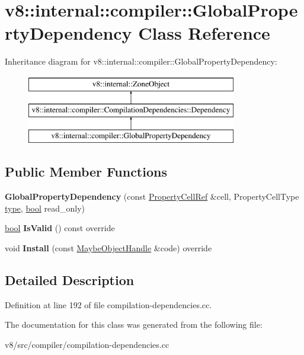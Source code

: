 \hypertarget{classv8_1_1internal_1_1compiler_1_1GlobalPropertyDependency}{}\section{v8\+:\+:internal\+:\+:compiler\+:\+:Global\+Property\+Dependency Class Reference}
\label{classv8_1_1internal_1_1compiler_1_1GlobalPropertyDependency}
Inheritance diagram for v8\+:\+:internal\+:\+:compiler\+:\+:Global\+Property\+Dependency\+:\begin{figure}[H]
\begin{center}
\leavevmode
\includegraphics[height=3.000000cm]{classv8_1_1internal_1_1compiler_1_1GlobalPropertyDependency}
\end{center}
\end{figure}
\subsection*{Public Member Functions}
\begin{DoxyCompactItemize}
\item 
\mbox{\label{classv8_1_1internal_1_1compiler_1_1GlobalPropertyDependency_aa75480ff3878e2e51224f42c92674c16}} 
{\bfseries Global\+Property\+Dependency} (const \mbox{\hyperlink{classv8_1_1internal_1_1compiler_1_1PropertyCellRef}{Property\+Cell\+Ref}} \&cell, Property\+Cell\+Type \mbox{\hyperlink{classstd_1_1conditional_1_1type}{type}}, \mbox{\hyperlink{classbool}{bool}} read\+\_\+only)
\item 
\mbox{\label{classv8_1_1internal_1_1compiler_1_1GlobalPropertyDependency_a2734e20aeac3c673d4cb53c33627d135}} 
\mbox{\hyperlink{classbool}{bool}} {\bfseries Is\+Valid} () const override
\item 
\mbox{\label{classv8_1_1internal_1_1compiler_1_1GlobalPropertyDependency_af5d4e590f55c5ea4c22864dcbbbec40e}} 
void {\bfseries Install} (const \mbox{\hyperlink{classv8_1_1internal_1_1MaybeObjectHandle}{Maybe\+Object\+Handle}} \&code) override
\end{DoxyCompactItemize}


\subsection{Detailed Description}


Definition at line 192 of file compilation-\/dependencies.\+cc.



The documentation for this class was generated from the following file\+:\begin{DoxyCompactItemize}
\item 
v8/src/compiler/compilation-\/dependencies.\+cc\end{DoxyCompactItemize}
